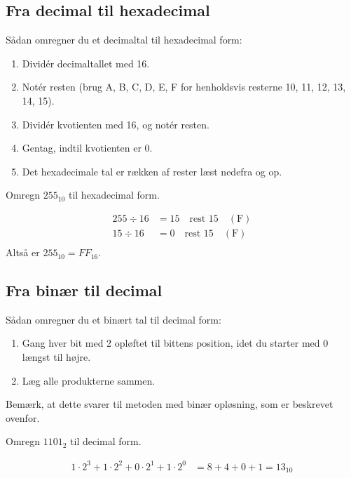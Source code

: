 \subsection*{Fra decimal til hexadecimal}
Sådan omregner du et decimaltal til hexadecimal form:
\begin{enumerate}
    \item Dividér decimaltallet med 16.
    \item Notér resten (brug A, B, C, D, E, F for henholdsvis resterne 10, 11, 12, 13, 14, 15).
    \item Dividér kvotienten med 16, og notér resten.
    \item Gentag, indtil kvotienten er 0.
    \item Det hexadecimale tal er rækken af rester læst nedefra og op.
\end{enumerate}

\begin{example}Omregn \(255_{10}\) til hexadecimal form.

\begin{solution}
    
\[
\begin{aligned}
255 \div 16 & = 15 \quad \text{rest } 15 \quad (\text{F}) \\
15 \div 16 & = 0 \quad \text{rest } 15 \quad (\text{F}) \\
\end{aligned}
\]
Altså er \(255_{10} = FF_{16}\).\end{solution}

\end{example}


\subsection*{Fra binær til decimal}
Sådan omregner du et binært tal til decimal form:
\begin{enumerate}
    \item Gang hver bit med 2 opløftet til bittens position, idet du starter med 0 længst til højre.
    \item Læg alle produkterne sammen.
\end{enumerate}

Bemærk, at dette svarer til metoden med binær opløsning, som er beskrevet ovenfor.

\begin{example} Omregn \(1101_2\) til decimal form.

\begin{solution}
    

\[
\begin{aligned}
1 \cdot 2^3 + 1 \cdot 2^2 + 0 \cdot 2^1 + 1 \cdot 2^0 & = 8 + 4 + 0 + 1 = 13_{10}
\end{aligned}
\] \end{solution}

\end{example}

